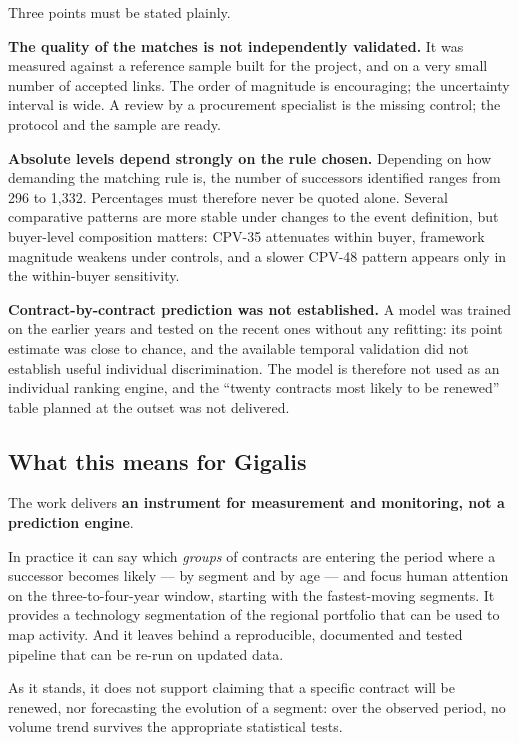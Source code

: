 Three points must be stated plainly.

\textbf{The quality of the matches is not independently validated.} It was measured against a reference sample built for the project, and on a very small number of accepted links. The order of magnitude is encouraging; the uncertainty interval is wide. A review by a procurement specialist is the missing control; the protocol and the sample are ready.

\textbf{Absolute levels depend strongly on the rule chosen.} Depending on how demanding the matching rule is, the number of successors identified ranges from 296 to 1,332. Percentages must therefore never be quoted alone. Several comparative patterns are more stable under changes to the event definition, but buyer-level composition matters: CPV-35 attenuates within buyer, framework magnitude weakens under controls, and a slower CPV-48 pattern appears only in the within-buyer sensitivity.

\textbf{Contract-by-contract prediction was not established.} A model was trained on the earlier years and tested on the recent ones without any refitting: its point estimate was close to chance, and the available temporal validation did not establish useful individual discrimination. The model is therefore not used as an individual ranking engine, and the ``twenty contracts most likely to be renewed'' table planned at the outset was not delivered.

\subsection*{What this means for Gigalis}

The work delivers \textbf{an instrument for measurement and monitoring, not a prediction engine}.

In practice it can say which \emph{groups} of contracts are entering the period where a successor becomes likely --- by segment and by age --- and focus human attention on the three-to-four-year window, starting with the fastest-moving segments. It provides a technology segmentation of the regional portfolio that can be used to map activity. And it leaves behind a reproducible, documented and tested pipeline that can be re-run on updated data.

As it stands, it does not support claiming that a specific contract will be renewed, nor forecasting the evolution of a segment: over the observed period, no volume trend survives the appropriate statistical tests.

